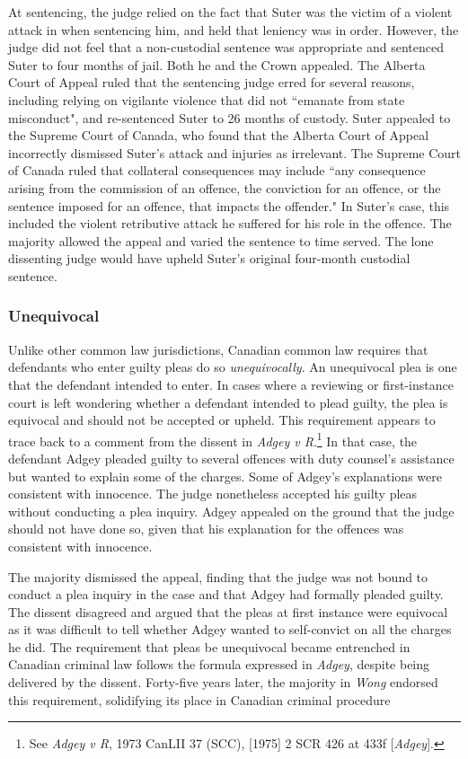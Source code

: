 At sentencing, the judge relied on the fact that Suter was the victim of a violent attack in when sentencing him, and held that leniency was in order. However, the judge did not feel that a non-custodial sentence was appropriate and sentenced Suter to four months of jail. Both he and the Crown appealed. The Alberta Court of Appeal ruled that the sentencing judge erred for several reasons, including relying on vigilante violence that did not ``emanate from state misconduct", and re-sentenced Suter to 26 months of custody. Suter appealed to the Supreme Court of Canada, who found that the Alberta Court of Appeal incorrectly dismissed Suter's attack and injuries as irrelevant. The Supreme Court of Canada ruled that collateral consequences may include ``any consequence arising from the commission of an offence, the conviction for an offence, or the sentence imposed for an offence, that impacts the offender." In Suter's case, this included the violent retributive attack he suffered for his role in the offence. The majority allowed the appeal and varied the sentence to time served. The lone dissenting judge would have upheld Suter's original four-month custodial sentence.

\subsubsection{Unequivocal}

Unlike other common law jurisdictions, Canadian common law requires that defendants who enter guilty pleas do so \textit{unequivocally}. An unequivocal plea is one that the defendant intended to enter. In cases where a reviewing or first-instance court is left wondering whether a defendant intended to plead guilty, the plea is equivocal and should not be accepted or upheld. This requirement appears to trace back to a comment from the dissent in \textit{Adgey v R}.\footnote{See \textit{Adgey v R},  1973 CanLII 37 (SCC), [1975] 2 SCR 426 at 433f [\textit{Adgey}].} In that case, the defendant Adgey pleaded guilty to several offences with duty counsel's assistance but wanted to explain some of the charges. Some of Adgey's explanations were consistent with innocence. The judge nonetheless accepted his guilty pleas without conducting a plea inquiry. Adgey appealed on the ground that the judge should not have done so, given that his explanation for the offences was consistent with innocence. 

The majority dismissed the appeal, finding that the judge was not bound to conduct a plea inquiry in the case and that Adgey had formally pleaded guilty. The dissent disagreed and argued that the pleas at first instance were equivocal as it was difficult to tell whether Adgey wanted to self-convict on all the charges he did. The requirement that pleas be unequivocal became entrenched in Canadian criminal law follows the formula expressed in \textit{Adgey}, despite being delivered by the dissent. Forty-five years later, the majority in \textit{Wong} endorsed this requirement, solidifying its place in Canadian criminal procedure

